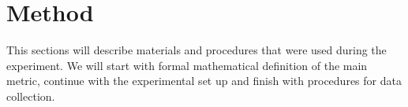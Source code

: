 \section{Method}

This sections will describe materials and procedures that were used during the experiment. We will start with formal mathematical definition of the main metric, continue with the experimental set up and finish with procedures for data collection.
